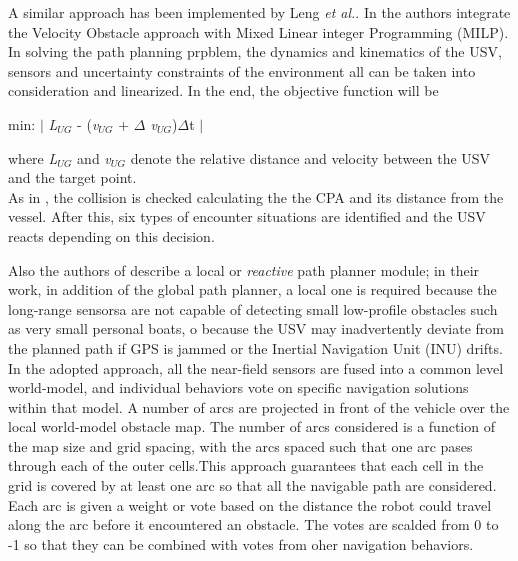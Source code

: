 \documentclass[journal]{IEEEtran}
\begin{document}
  \indent A similar approach has been implemented by Leng \textit{et al.}. In \cite{Leng2013} the authors integrate the Velocity Obstacle approach with Mixed Linear integer Programming (MILP). In solving the path planning prpblem, the dynamics and kinematics of the USV, sensors and uncertainty constraints of the environment all can be taken into consideration and linearized. In the end, the objective function will be
      \begin{center}
        min: $ \mid $ \textit{L$_{UG}$} - (\textit{v$_{UG}$} + \textit{$\Delta$ v$_{UG}$})$\Delta$t $ \mid$
      \end{center}
  where \textit{L$_{UG}$} and \textit{v$_{UG}$} denote the relative distance and velocity between the USV and the target point.\\
  As in \cite{Kuwata2014}, the collision is checked calculating the the CPA and its distance from the vessel. After this, six types of encounter situations are identified and the USV reacts depending on this decision.

  \indent Also the authors of \cite{Larson2007,Larson2007a} describe a local or \textit{reactive} path planner module; in their work, in addition of the global path planner, a local one is required because the long-range sensorsa are not capable of detecting small low-profile obstacles such as very small personal boats, o because the USV may inadvertently deviate from the planned path if GPS is jammed or the Inertial Navigation Unit (INU) drifts. \\
  In the adopted approach, all the near-field sensors are fused into a common level world-model, and individual behaviors vote on specific navigation solutions within that model. A number of arcs are projected in front of the vehicle over the local world-model obstacle map. The number of arcs considered is a function of the map size and grid spacing, with the arcs spaced such that one arc pases through each of the outer cells.This approach guarantees that each cell in the grid is covered by at least one arc so that all the navigable path are considered. Each arc is given a weight or vote based on the distance the robot could travel along the arc before it encountered an obstacle. The votes are scalded from 0 to -1 so that they can be combined with votes from oher navigation behaviors.\\
\end{document}
